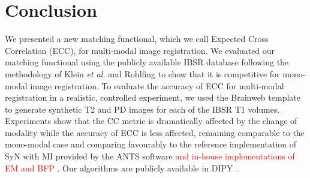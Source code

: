 \section{Conclusion}
We presented a new matching functional, which we call Expected Cross Correlation (ECC), for multi-modal image registration. We evaluated our matching functional using the publicly available IBSR database following the methodology of Klein {\it et al.} \cite{Klein2009, Klein2010} and Rohlfing \cite{Rohlfing2012} to show that it is competitive for mono-modal image registration. To evaluate the accuracy of ECC for multi-modal registration in a realistic, controlled experiment, we used the Brainweb \cite{Cocosco1997, Kwan1999} template to generate synthetic T2 and PD images for each of the IBSR T1 volumes. Experiments show that the CC metric is dramatically affected by the change of modality while the accuracy of ECC is less affected, remaining comparable to the mono-modal case and comparing favourably to the reference implementation of SyN with MI \cite{Mattes2003} provided by the ANTS software \textcolor{red}{ and in-house implementations of EM \cite{Arce-santana2014} and BFP \cite{Guimond2001}}. Our algorithms are publicly available in DIPY \cite{Garyfallidis2014}.


